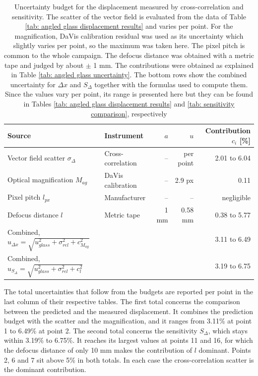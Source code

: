 \begin{table}[h]
    \centering
    \caption[Uncertainty budget of the measured displacement and sensitivity]{Uncertainty budget for the displacement measured by cross-correlation and sensitivity. The scatter of the vector field is evaluated from the data of Table \ref{tab: angled glass displacement results} and varies per point. For the magnification, DaVis calibration residual was used as its uncertainty which slightly varies per point, so the maximum was taken here. The pixel pitch is common to the whole campaign. The defocus distance was obtained with a metric tape and judged by about $\pm$ 1 mm. The contributions were obtained as explained in Table \ref{tab: angled glass uncertainty}. The bottom rows show the combined uncertainty for $\Delta x$ and $S_\Delta$ together with the formulas used to compute them. Since the values vary per point, its range is presented here but they can be found in Tables \ref{tab: angled glass displacement results} and \ref{tab: sensitivity comparison}, respectively}
    \label{tab: measurement uncertainty}
    \small
    \begin{tabular}{llrrr}
        \toprule
        Source & Instrument & $a$ & $u$ & Contribution $c_i$ [\%] \\
        \midrule
        Vector field scatter $\sigma_\Delta$        & Cross-correlation & --     & per point & 2.01 to 6.04 \\
        Optical magnification $M_{ag}$              & DaVis calibration & --     & 2.9 px    & 0.11 \\
        Pixel pitch $l_{px}$                        & Manufacturer      & --     & --        & negligible \\
        Defocus distance $l$                        & Metric tape       & 1 mm   & 0.58 mm   & 0.38 to 5.77 \\
        \midrule
        Combined, $u_{\Delta x} = \sqrt{u_{glass}^2+\sigma_{rel}^2 + c_{M_{ag}}^2 }$             &  &  &  & 3.11 to 6.49 \\
        Combined, $u_{S_\Delta} = \sqrt{u_{glass}^2+\sigma_{rel}^2 + c_{l}^2 }$  &  &  &  & 3.19 to 6.75 \\
        \bottomrule
    \end{tabular}
\end{table}


\par The total uncertainties that follow from the budgets are reported per point in the last column of their respective tables. The first total concerns the comparison between the predicted and the measured displacement. It combines the prediction budget with the scatter and the magnification, and it ranges from 3.11\% at point 1 to 6.49\% at point 2. The second total concerns the sensitivity $S_{\Delta}$, which stays within 3.19\% to 6.75\%. It reaches its largest values at points 11 and 16, for which the defocus distance of only 10 mm makes the contribution of $l$ dominant. Points 2, 6 and 7 sit above 5\% in both totals. In each case the cross-correlation scatter is the dominant contribution.

